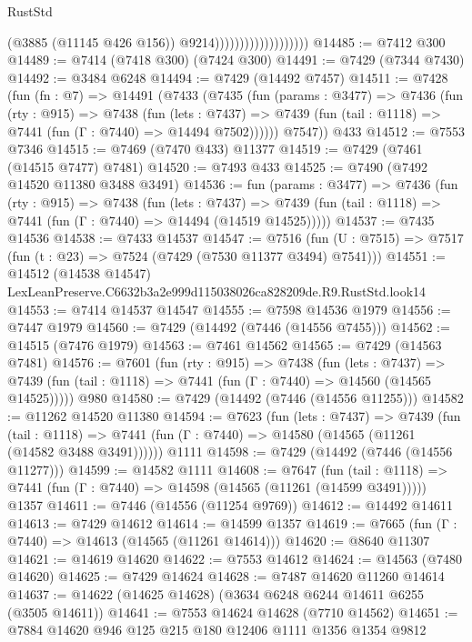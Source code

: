 \begin{lexlean}{RustStd}
\begin{coremodule}
                                          (@3885 (@11145 @426 @156))
                                          @9214)))))))))))))))))))
@14485 := @7412 @300
@14489 := @7414 (@7418 @300) (@7424 @300)
@14491 := @7429 (@7344 @7430)
@14492 := @3484 @6248
@14494 := @7429 (@14492 @7457)
@14511 := @7428
    (fun (fn : @7) =>
    @14491
      (@7433
        (@7435
          (fun (params : @3477) =>
          @7436
            (fun (rty : @915) =>
            @7438
              (fun (lets : @7437) =>
              @7439 (fun (tail : @1118) => @7441 (fun (Γ : @7440) => @14494 @7502))))))
        @7547))
    @433
@14512 := @7553 @7346
@14515 := @7469 (@7470 @433) @11377
@14519 := @7429 (@7461 (@14515 @7477) @7481)
@14520 := @7493 @433
@14525 := @7490 (@7492 @14520 @11380 @3488 @3491)
@14536 := fun (params : @3477) =>
  @7436
    (fun (rty : @915) =>
    @7438
      (fun (lets : @7437) =>
      @7439 (fun (tail : @1118) => @7441 (fun (Γ : @7440) => @14494 (@14519 @14525)))))
@14537 := @7435 @14536
@14538 := @7433 @14537
@14547 := @7516
    (fun (U : @7515) => @7517 (fun (t : @23) => @7524 (@7429 (@7530 @11377 @3494) @7541)))
@14551 := @14512 (@14538 @14547) LexLeanPreserve.C6632b3a2e999d115038026ca828209de.R9.RustStd.look14
@14553 := @7414 @14537 @14547
@14555 := @7598 @14536 @1979
@14556 := @7447 @1979
@14560 := @7429 (@14492 (@7446 (@14556 @7455)))
@14562 := @14515 (@7476 @1979)
@14563 := @7461 @14562
@14565 := @7429 (@14563 @7481)
@14576 := @7601
    (fun (rty : @915) =>
    @7438
      (fun (lets : @7437) =>
      @7439 (fun (tail : @1118) => @7441 (fun (Γ : @7440) => @14560 (@14565 @14525)))))
    @980
@14580 := @7429 (@14492 (@7446 (@14556 @11255)))
@14582 := @11262 @14520 @11380
@14594 := @7623
    (fun (lets : @7437) =>
    @7439
      (fun (tail : @1118) =>
      @7441 (fun (Γ : @7440) => @14580 (@14565 (@11261 (@14582 @3488 @3491))))))
    @1111
@14598 := @7429 (@14492 (@7446 (@14556 @11277)))
@14599 := @14582 @1111
@14608 := @7647
    (fun (tail : @1118) => @7441 (fun (Γ : @7440) => @14598 (@14565 (@11261 (@14599 @3491)))))
    @1357
@14611 := @7446 (@14556 (@11254 @9769))
@14612 := @14492 @14611
@14613 := @7429 @14612
@14614 := @14599 @1357
@14619 := @7665 (fun (Γ : @7440) => @14613 (@14565 (@11261 @14614)))
@14620 := @8640 @11307
@14621 := @14619 @14620
@14622 := @7553 @14612
@14624 := @14563 (@7480 @14620)
@14625 := @7429 @14624
@14628 := @7487 @14620 @11260 @14614
@14637 := @14622 (@14625 @14628) (@3634 @6248 @6244 @14611 @6255 (@3505 @14611))
@14641 := @7553 @14624 @14628 (@7710 @14562)
@14651 := @7884 @14620 @946 @125 @215 @180 @12406 @1111 @1356 @1354 @9812

\end{coremodule}
\end{lexlean}
